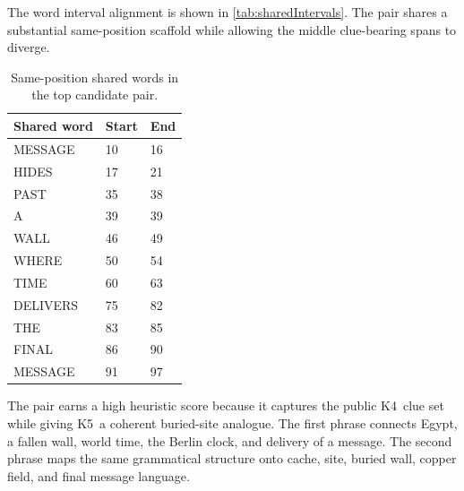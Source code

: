 \documentclass[12pt]{paperFormatting}
\newcommand{\Kfour}{K4}
\newcommand{\Kfive}{K5}
\begin{document}
\begin{thesisbody}
The word interval alignment is shown in \autoref{tab:sharedIntervals}. The pair shares a substantial same-position scaffold while allowing the middle clue-bearing spans to diverge.

\begin{table}[H]
\caption{Same-position shared words in the top candidate pair.}
\label{tab:sharedIntervals}
\centering
\small
\begin{tabular}{L{0.32\textwidth}C{0.16\textwidth}C{0.16\textwidth}}
\toprule
Shared word & Start & End \\
\midrule
MESSAGE & 10 & 16 \\
HIDES & 17 & 21 \\
PAST & 35 & 38 \\
A & 39 & 39 \\
WALL & 46 & 49 \\
WHERE & 50 & 54 \\
TIME & 60 & 63 \\
DELIVERS & 75 & 82 \\
THE & 83 & 85 \\
FINAL & 86 & 90 \\
MESSAGE & 91 & 97 \\
\bottomrule
\end{tabular}
\end{table}

The pair earns a high heuristic score because it captures the public \Kfour\ clue set while giving \Kfive\ a coherent buried-site analogue. The first phrase connects Egypt, a fallen wall, world time, the Berlin clock, and delivery of a message. The second phrase maps the same grammatical structure onto cache, site, buried wall, copper field, and final message language.


\end{thesisbody}
\end{document}

